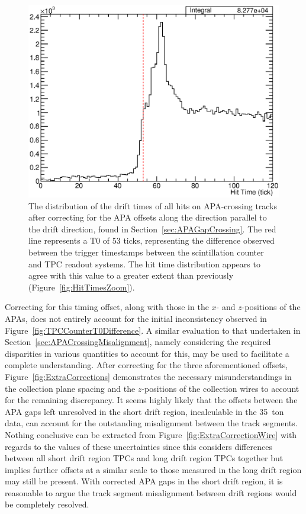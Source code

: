 \begin{figure}
  \centering
  \includegraphics[width=12cm]{HitTimesFixed.eps}
  \caption[The distribution of the drift times of all hits on APA-crossing tracks after correcting for the APA offsets along the direction parallel to the drift direction.]{The distribution of the drift times of all hits on APA-crossing tracks after correcting for the APA offsets along the direction parallel to the drift direction, found in Section~\ref{sec:APAGapCrossing}.  The red line represents a T0 of 53 ticks, representing the difference observed between the trigger timestamps between the scintillation counter and TPC readout systems.  The hit time distribution appears to agree with this value to a greater extent than previously (Figure~\ref{fig:HitTimesZoom}).}
  \label{fig:HitTimesFixed}
\end{figure}

Correcting for this timing offset, along with those in the $x$- and $z$-positions of the APAs, does not entirely account for the initial inconsistency observed in Figure~\ref{fig:TPCCounterT0Difference}.  A similar evaluation to that undertaken in Section~\ref{sec:APACrossingMisalignment}, namely considering the required disparities in various quantities to account for this, may be used to facilitate a complete understanding.  After correcting for the three aforementioned offsets, Figure~\ref{fig:ExtraCorrections} demonstrates the necessary misunderstandings in the collection plane spacing and the $z$-positions of the collection wires to account for the remaining discrepancy.  It seems highly likely that the offsets between the APA gaps left unresolved in the short drift region, incalculable in the 35~ton data, can account for the outstanding misalignment between the track segments.  Nothing conclusive can be extracted from Figure~\ref{fig:ExtraCorrectionWire} with regards to the values of these uncertainties since this considers differences between all short drift region TPCs and long drift region TPCs together but implies further offsets at a similar scale to those measured in the long drift region may still be present.  With corrected APA gaps in the short drift region, it is reasonable to argue the track segment misalignment between drift regions would be completely resolved.

